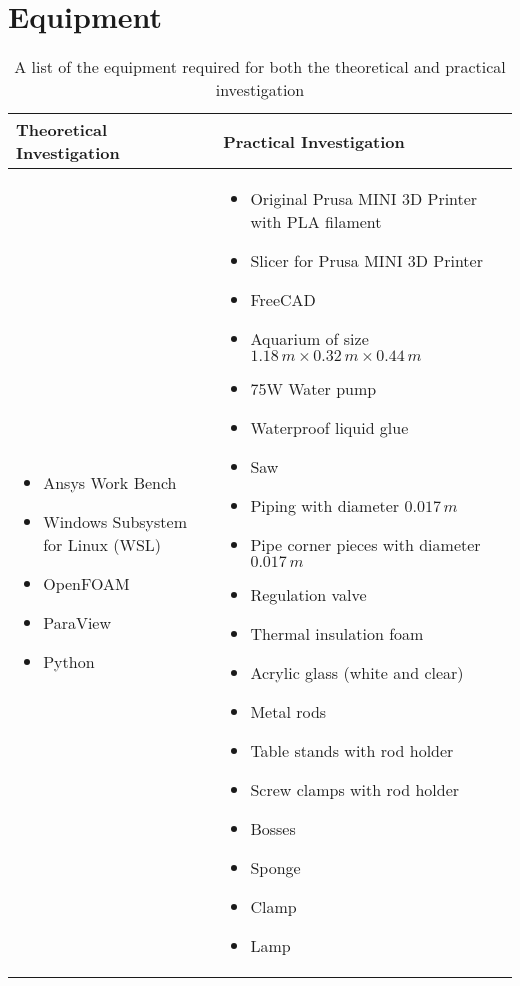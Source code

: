 \section{Equipment}
\begin{table}[H]
	\centering
	\renewcommand{\arraystretch}{1.3}
	\begin{tabularx}{\textwidth}{|X|X|}
		\hline
		\textbf{Theoretical Investigation} & \textbf{Practical Investigation} \\
		\hline
		\begin{itemize}[leftmargin=1.5em, itemsep=2pt, topsep=0pt, label=--]
			\item Ansys Work Bench \parencite{noauthor_ansys_nodate}
			\item Windows Subsystem for Linux (WSL) \parencite{noauthor_windows_nodate}
			\item OpenFOAM \parencite{noauthor_openfoam_2024}
			\item ParaView \parencite{noauthor_paraview_nodate}
			\item Python \parencite{noauthor_python_2025}
		\end{itemize} 
		&
		\begin{itemize}[leftmargin=1.5em, itemsep=2pt, topsep=0pt, label=--]
			\item Original Prusa MINI 3D Printer with PLA filament \parencite{noauthor_prusa_nodate}
			\item Slicer for Prusa MINI 3D Printer \parencite{noauthor_prusaslicer_nodate}
			\item FreeCAD \parencite{noauthor_freecad_nodate}
			\item Aquarium of size $ 1.18\,m \times 0.32\,m \times 0.44\,m $
			\item 75W Water pump \parencite{noauthor_lnicez_nodate}
			\item Waterproof liquid glue
			\item Saw
			\item Piping with diameter \diameter $0.017\,m$ 
			\item Pipe corner pieces with diameter \diameter $0.017\,m$ 
			\item Regulation valve
			\item Thermal insulation foam
			\item Acrylic glass (white and clear)
			\item Metal rods
			\item Table stands with rod holder
			\item Screw clamps with rod holder
			\item Bosses
			\item Sponge
			\item Clamp
			\item Lamp
		\end{itemize} \\
		\hline
	\end{tabularx}
	\caption{A list of the equipment required for both the theoretical and practical investigation}
	\label{tab:equipmentList1}
\end{table}

